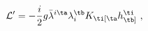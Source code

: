 \begin{equation}\label{Yukawaterm}
\mathcal{L}'=
-\frac{i}{2}g{\bar{\lambda}}^{i\ta}\lambda_{i}^{\tb}K_{\ti[\ta}
h^{\ti}_{\tb]} \ ,
\end{equation}

